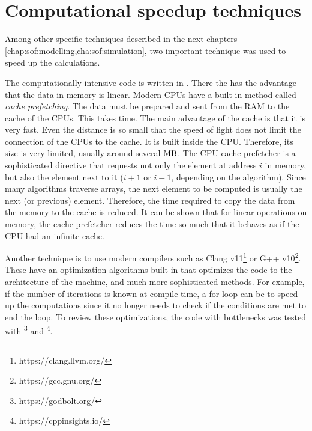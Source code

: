 \section{Computational speedup techniques}\label{sec:theorySpeedup}
%
Among other specific techniques described in the next chapters \cref{chap:sof:modelling,cha:sof:simulation}, two important technique was used to speed up the calculations.
\par
%
The computationally intensive code is written in \cpp{}.
There the  has the advantage that the data in memory is linear.
Modern \acp{CPU} have a built-in method called \textit{cache prefetching}.
The data must be prepared and sent from the \ac{RAM} to the cache of the \acp{CPU}.
This takes time.
The main advantage of the cache is that it is very fast.
Even the distance is so small that the speed of light does not limit the connection of the \acp{CPU} to the cache.
It is built inside the \ac{CPU}.
Therefore, its size is very limited, usually around several $\si{\mega\byte}$.
The \ac{CPU} cache prefetcher is a sophisticated directive that requests not only the element at address $i$ in memory, but also the element next to it ($i+1$ or $i-1$, depending on the algorithm).
Since many algorithms traverse arrays, the next element to be computed is usually the next (or previous) element.
Therefore, the time required to copy the data from the memory to the cache is reduced.
It can be shown that for linear operations on memory, the cache prefetcher reduces the time so much that it behaves as if the \ac{CPU} had an infinite cache.
\par
%
Another technique is to use modern compilers such as Clang v11\footnote{https://clang.llvm.org/} or G++ v10\footnote{https://gcc.gnu.org/}.
These have an optimization algorithms built in that optimizes the code to the architecture of the machine, and much more sophisticated methods.
For example, if the number of iterations is known at compile time, a for loop can be  to speed up the computations since it no longer needs to check if the conditions are met to end the loop.
To review these optimizations, the code with bottlenecks was tested with \footnote{https://godbolt.org/} and \footnote{https://cppinsights.io/}.
%